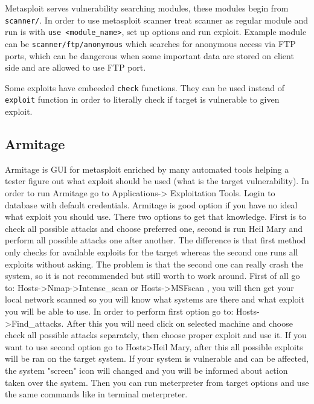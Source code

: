\documentclass{article}[12pt]
\begin{document}
Metasploit serves vulnerability searching modules, these modules begin from \texttt{scanner/}.
In order to use metasploit scanner treat scanner as regular module and run is with \texttt{use <module\_name>}, set up options and run exploit.
Example module can be \texttt{scanner/ftp/anonymous} which searches for anonymous access via FTP ports, which can be dangerous when some important data
are stored on client side and are allowed to use FTP port.

Some exploits have embeeded \texttt{check} functions.
They can be used instead of \texttt{exploit} function in order to literally check if target is vulnerable to given exploit.


\subsection{Armitage}

Armitage is GUI for metasploit enriched by many automated tools helping a tester figure out what exploit should be used (what is the target vulnerability).
In order to run Armitage go to Applications-> Exploitation Tools.
Login to database with default credentials.
Armitage is good option if you have no ideal what exploit you should use.
There two options to get that knowledge.
First is to check all possible attacks and choose preferred one, second is run Heil Mary and perform all possible attacks one after another.
The difference is that first method
only checks for available exploits for the target whereas the second one runs all exploits without asking.
The problem is that the second one can really crash the system, so it is not recommended but still worth to work around.
First of all go to: Hosts->Nmap->Intense\_scan or Hosts->MSFscan
, you will then get your local network scanned so you will know what systems are there and what exploit you will be able to use.
In order to perform first option go to: Hosts->Find\_attacks.
After this you will need click on selected machine and choose check all possible attacks separately, then choose proper exploit and use it.
If you want to use second option go to Hosts>Heil Mary, after this all possible exploits will be ran on the target system.
If your system is vulnerable and can be affected, the system "screen" icon will changed and you will be informed about action taken over the system.
Then you can run meterpreter from target options and use the same commands like in terminal meterpreter.
\end{document}
